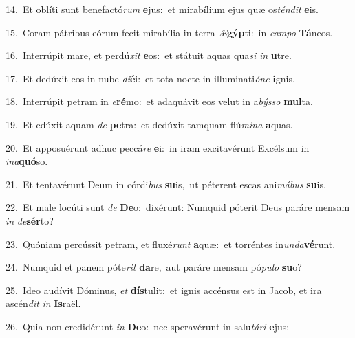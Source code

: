 {\numbfont\textcolor{\numbcolor}{14.}}~Et oblíti sunt benefactó\textit{rum} \textbf{e}\-jus:~\star et mirabílium ejus quæ os\-\textit{tén}\-\textit{dit} \textbf{e}\-is.\par
{\numbfont\textcolor{\numbcolor}{15.}}~Coram pátribus eórum fecit mirabília in terra \textit{Æ}\-\textbf{gýp}ti:~\star in \textit{cam}\-\textit{po} \textbf{Tá}\-neos.\par
{\numbfont\textcolor{\numbcolor}{16.}}~Interrúpit mare, et perdú\textit{xit} \textbf{e}\-os:~\star et státuit aquas qua\textit{si} \textit{in} \textbf{u}\-tre.\par
{\numbfont\textcolor{\numbcolor}{17.}}~Et dedúxit eos in nube \textit{di}\-\textbf{é}i:~\star et tota nocte in illuminati\-\textit{ó}\-\textit{ne} \textbf{i}\-gnis.\par
{\numbfont\textcolor{\numbcolor}{18.}}~Interrúpit petram in \textit{e}\-\textbf{ré}mo:~\star et adaquávit eos velut in a\-\textit{býs}\-\textit{so} \textbf{mul}\-ta.\par
{\numbfont\textcolor{\numbcolor}{19.}}~Et edúxit aquam \textit{de} \textbf{pe}\-tra:~\star et dedúxit tamquam flú\-\textit{mi}\-\textit{na} \textbf{a}\-quas.\par
{\numbfont\textcolor{\numbcolor}{20.}}~Et apposuérunt adhuc peccá\textit{re} \textbf{e}\-i:~\star in iram excitavérunt Excélsum in \textit{in}\-\textit{a}\textbf{quó}so.\par
{\numbfont\textcolor{\numbcolor}{21.}}~Et tentavérunt Deum in córdi\textit{bus} \textbf{su}\-is,~\star ut péterent escas ani\-\textit{má}\-\textit{bus} \textbf{su}\-is.\par
{\numbfont\textcolor{\numbcolor}{22.}}~Et male locúti sunt \textit{de} \textbf{De}\-o:~\star dixérunt: Numquid póterit Deus paráre mensam \textit{in} \textit{de}\-\textbf{sér}to?\par
{\numbfont\textcolor{\numbcolor}{23.}}~Quóniam percússit petram, et fluxé\textit{runt} \textbf{a}\-quæ:~\star et torréntes in\-\textit{un}\-\textit{da}\textbf{vé}runt.\par
{\numbfont\textcolor{\numbcolor}{24.}}~Numquid et panem póte\textit{rit} \textbf{da}\-re,~\star aut paráre mensam pó\-\textit{pu}\-\textit{lo} \textbf{su}\-o?\par
{\numbfont\textcolor{\numbcolor}{25.}}~Ideo audívit Dóminus, \textit{et} \textbf{dís}\-tulit:~\star et ignis accénsus est in Jacob, et ira ascén\textit{dit} \textit{in} \textbf{Is}\-raël.\par
{\numbfont\textcolor{\numbcolor}{26.}}~Quia non credidérunt \textit{in} \textbf{De}\-o:~\star nec speravérunt in salu\-\textit{tá}\-\textit{ri} \textbf{e}\-jus:\par
